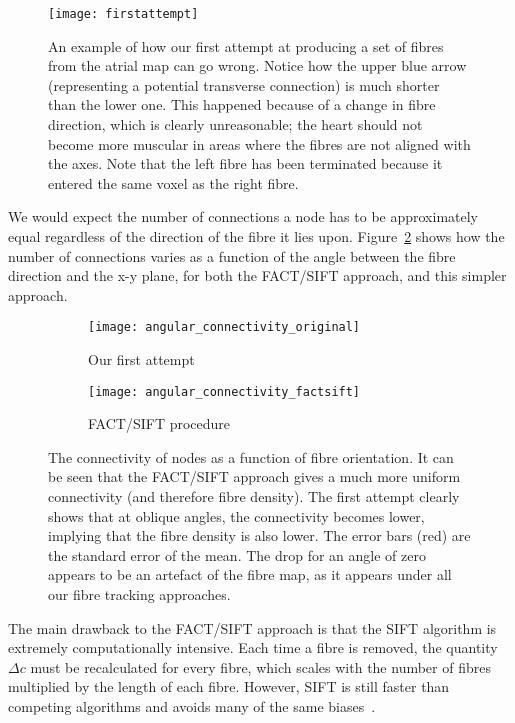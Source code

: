 \begin{figure}[h] \begin{mdframed}
    \centering
    \texttt{[image: firstattempt]}
    \caption{An example of how our first attempt at producing a set of fibres from the atrial map can go wrong. Notice how the upper blue arrow (representing a potential transverse connection) is much shorter than the lower one. This happened because of a change in fibre direction, which is clearly unreasonable; the heart should not become more muscular in areas where the fibres are not aligned with the axes. Note that the left fibre has been terminated because it entered the same voxel as the right fibre.}
    \label{fig:firstattempt}
\end{mdframed} \end{figure}

We would expect the number of connections a node has to be approximately equal regardless of the direction of the fibre it lies upon. Figure~\ref{fig:angulardep} shows how the number of connections varies as a function of the angle between the fibre direction and the x-y plane, for both the FACT/SIFT approach, and this simpler approach.

\begin{figure}[h] \begin{mdframed}
    \centering
    \begin{subfigure}[b]{0.8\textwidth}
        \texttt{[image: angular\_connectivity\_original]}
        \caption{Our first attempt}
    \end{subfigure}
    
    \begin{subfigure}[b]{0.8\textwidth}
        \texttt{[image: angular\_connectivity\_factsift]}
        \caption{FACT/SIFT procedure}
    \end{subfigure}
    \caption{The connectivity of nodes as a function of fibre orientation. It can be seen that the FACT/SIFT approach gives a much more uniform connectivity (and therefore fibre density). The first attempt clearly shows that at oblique angles, the connectivity becomes lower, implying that the fibre density is also lower. The error bars (red) are the standard error of the mean. The drop for an angle of zero appears to be an artefact of the fibre map, as it appears under all our fibre tracking approaches.}
    \label{fig:angulardep}
\end{mdframed} \end{figure}

The main drawback to the FACT/SIFT approach is that the SIFT algorithm is extremely computationally intensive. Each time a fibre is removed, the quantity $\Delta c$ must be recalculated for every fibre, which scales with the number of fibres multiplied by the length of each fibre. However, SIFT is still faster than competing algorithms and avoids many of the same biases~\cite{sift}.

